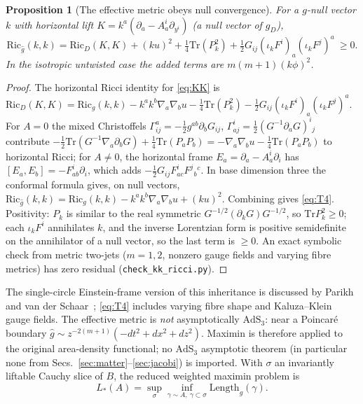 \documentclass[aps,prd,onecolumn,superscriptaddress,nofootinbib,amsmath,amssymb,11pt]{revtex4-2}
\newtheorem{proposition}[theorem]{Proposition}
\theoremstyle{definition}
\newcommand{\AdS}{\mathrm{AdS}_3}
\begin{document}
\begin{proposition}[The effective metric obeys null convergence]\label{prop:KKric}
For a $g$-null vector $k$ with horizontal lift $K=k^a(\partial_a-A^i_a\partial_{y^i})$ (a null vector of $g_D$),
\begin{equation}\label{eq:T4}
\mathrm{Ric}_{\widehat g}(k,k)=\mathrm{Ric}_D(K,K)+(ku)^2+\tfrac14\mathrm{Tr}(P_k^2)+\tfrac12G_{ij}(\iota_kF^i)_a(\iota_kF^j)^a\ \ge0 .
\end{equation}
In the isotropic untwisted case the added terms are $m(m+1)(k\phi)^2$.
\end{proposition}

\begin{proof}
The horizontal Ricci identity for \eqref{eq:KK} is
$\mathrm{Ric}_D(K,K)=\mathrm{Ric}_g(k,k)-k^ak^b\nabla_a\nabla_bu-\frac14\mathrm{Tr}(P_k^2)-\frac12G_{ij}(\iota_kF^i)_a(\iota_kF^j)^a$. For $A=0$ the
mixed Christoffels $\Gamma^a_{ij}=-\frac12g^{ab}\partial_bG_{ij}$, $\Gamma^i_{aj}=\frac12(G^{-1}\partial_aG)^i{}_j$ contribute
$-\frac12\mathrm{Tr}(G^{-1}\nabla_a\partial_bG)+\frac14\mathrm{Tr}(P_aP_b)=-\nabla_a\nabla_bu-\frac14\mathrm{Tr}(P_aP_b)$ to horizontal Ricci; for
$A\ne0$, the horizontal frame $E_a=\partial_a-A^i_a\partial_i$ has $[E_a,E_b]=-F^i_{ab}\partial_i$, which adds
$-\frac12G_{ij}F^i_{ac}F^j{}_b{}^c$. In base dimension three the conformal formula gives, on null vectors,
$\mathrm{Ric}_{\widehat g}(k,k)=\mathrm{Ric}_g(k,k)-k^ak^b\nabla_a\nabla_bu+(ku)^2$. Combining gives \eqref{eq:T4}. Positivity: $P_k$ is similar to the
real symmetric $G^{-1/2}(\partial_kG)G^{-1/2}$, so $\mathrm{Tr}P_k^2\ge0$; each $\iota_kF^i$ annihilates $k$, and the inverse Lorentzian form
is positive semidefinite on the annihilator of a null vector, so the last term is $\ge0$. An exact symbolic check from metric
two-jets ($m=1,2$, nonzero gauge fields and varying fibre metrics) has zero residual (\texttt{check\_kk\_ricci.py}).
\end{proof}

The single-circle Einstein-frame version of this inheritance is discussed by Parikh and van der Schaar~\cite{ParikhVanDerSchaar2015};
\eqref{eq:T4} includes varying fibre shape and Kaluza--Klein gauge fields. The effective metric is \emph{not} asymptotically
$\AdS$: near a Poincar\'e boundary $\widehat g\sim z^{-2(m+1)}(-dt^2+dx^2+dz^2)$. Maximin is therefore applied to the original
area-density functional; no $\AdS$ asymptotic theorem (in particular none from Secs.~\ref{sec:matter}--\ref{sec:jacobi}) is
imported. With $\sigma$ an invariantly liftable Cauchy slice of $B$, the reduced weighted maximin problem is
\begin{equation}\label{eq:redmaximin}
L_*(A)=\sup_\sigma\inf_{\gamma\sim A,\ \gamma\subset\sigma}\mathrm{Length}_{\widehat g}(\gamma).
\end{equation}
\end{document}
